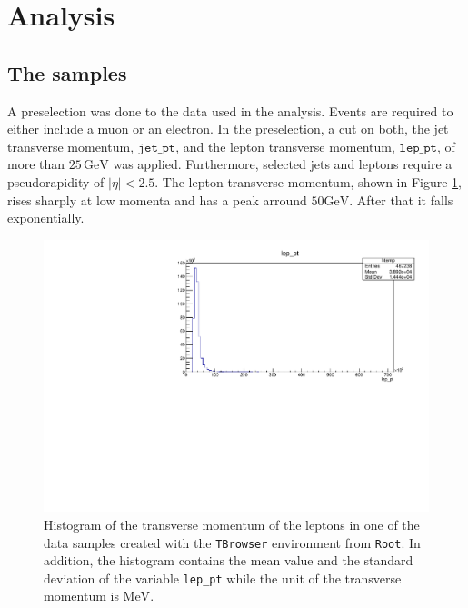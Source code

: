 \section{Analysis}\label{sec:analysis}

\subsection{The samples}
A preselection was done to the data used in the analysis. Events are required to either include a muon or an electron.
In the preselection, a cut on both, the jet transverse momentum, $\texttt{jet\_pt}$, and the lepton transverse momentum, $\texttt{lep\_pt}$,
of more than $25 \, \si{\giga\eV}$ was applied.
Furthermore, selected jets and leptons require a pseudorapidity of $|\eta| <2.5$.
The lepton transverse momentum, shown in Figure \ref{fig:unselected_pt}, rises sharply at low momenta and has a peak arround $50  \si{\giga\eV}$. After that it falls exponentially.

\begin{figure}[tb]
    \centering
    \includegraphics[width=.9\textwidth]{plots/TBrowser_hist.pdf}
    \caption{Histogram of the transverse momentum of the leptons in one of the data samples created with the \texttt{TBrowser} environment from \texttt{Root}.
    In addition, the histogram contains the mean value and the standard deviation of the variable \texttt{lep\_pt} while the unit of the transverse momentum is $\si{\mega\eV}$.}
    \label{fig:unselected_pt}
  \end{figure}

